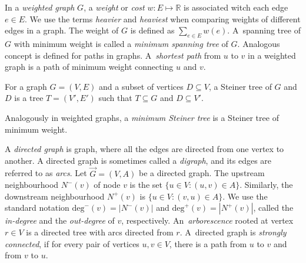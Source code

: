 In a \emph{weighted graph} $G$, a \emph{weight} or \emph{cost} $w:E\mapsto\mathbb{R}$ is associated witch each edge $e\in E$.
We use the terms \emph{heavier} and \emph{heaviest} when comparing weights of different edges in a graph.
The weight of $G$ is defined as $\sum_{e\in E}w(e)$.
A~spanning tree of $G$ with minimum weight is called a \emph{minimum spanning tree} of $G$.
Analogous concept is defined for paths in graphs.
A~\emph{shortest path} from $u$ to $v$ in a weighted graph is a path of minimum weight connecting $u$ and $v$.
\begin{definition}
	For a graph $G=(V,E)$ and a subset of vertices $D\subseteq V$, a Steiner tree of $G$ and $D$ is a tree $T=(V',E')$ such that $T\subseteq G$ and $D\subseteq V'$.
\end{definition}
Analogously in weighted graphs, a \emph{minimum Steiner tree} is a Steiner tree of minimum weight.

A \emph{directed graph} is graph, where all the edges are directed from one vertex to another. 
A directed graph is sometimes called a \emph{digraph}, and its edges are referred to as \emph{arcs}.
Let $\overrightarrow{G}=(V,A)$ be a directed graph. 
The upstream neighbourhood $N^-(v)$ of node $v$ is the set $\{u\in V: (u,v) \in A\}$. 
Similarly, the downstream neighbourhood $N^+(v)$ is $\{u\in V: (v,u) \in A\}$.
We use the standard notation $\text{deg}^-(v)=|N^-(v)|$ and $\text{deg}^+(v)=|N^+(v)|$, called the \emph{in-degree} and the \emph{out-degree} of $v$, respectively.
An~\emph{arborescence} rooted at vertex $r\in V$ is a directed tree with arcs directed from $r$.
A~directed graph is \emph{strongly connected}, if for every pair of vertices $u,v\in V$, there is a path from $u$ to $v$ and from $v$ to $u$.

